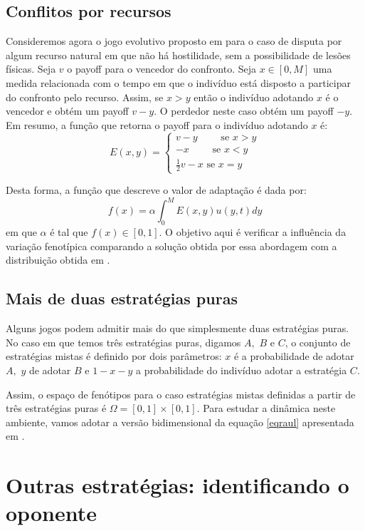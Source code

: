 \documentclass[
	12pt,				%
	openany,			%
	oneoside,			%
	a4paper,			%
	english,			%
	spanish,			%
	brazil,				%
	]{abntex2}
\begin{document}
\subsection{Conflitos por recursos}
Consideremos agora o jogo evolutivo proposto em \cite{MaynardSmith1974209} para o caso de disputa por algum recurso natural em que não há hostilidade, sem a possibilidade de lesões físicas. Seja $v$ o payoff para o vencedor do confronto. Seja $x \in [0, M]$ uma medida relacionada com o tempo em que o indivíduo está disposto a participar do confronto pelo recurso. Assim, se $x>y$ então o indivíduo adotando $x$ é o vencedor e obtém um payoff $v-y$. O perdedor neste caso obtém um payoff $-y.$  Em resumo, a função que retorna o payoff para o indivíduo adotando $x$ é:  
$$E(x,y)=\left\lbrace\begin{array}{l}
v-y\qquad\textrm{ se } x>y\\
-x\qquad\textrm{ se } x<y
\\
\frac{1}{2}v-x \textrm{ se } x=y
\end{array}\right.$$

Desta forma, a função que descreve o valor de adaptação é dada por:
$$f(x)=\alpha\int_0^ME(x,y)u(y,t)dy$$ em que $\alpha$ é tal que $f(x)\in[0,1].$ 
O objetivo aqui é verificar a influência da variação fenotípica comparando a solução obtida por essa abordagem com a distribuição obtida em \cite{MaynardSmith1974209}. 

\subsection{Mais de duas estratégias puras}
Alguns jogos podem admitir mais do que simplesmente duas estratégias puras. No caso em que temos três estratégias puras, digamos $A,$ $B$ e $C$, o conjunto de estratégias mistas é definido por dois parâmetros: $x$ é a probabilidade de adotar $A,$ $y$ de adotar $B$ e $1-x-y$ a probabilidade do indivíduo  adotar a estratégia $C.$

Assim, o espaço de fenótipos para o caso estratégias mistas definidas a partir de três estratégias puras é $\Omega=[0,1]\times[0,1].$ Para estudar a dinâmica neste ambiente, vamos adotar a versão bidimensional da equação \ref{eqraul} apresentada em \cite{RAAT}. 

\section{Outras estratégias: identificando o oponente}
\end{document}
